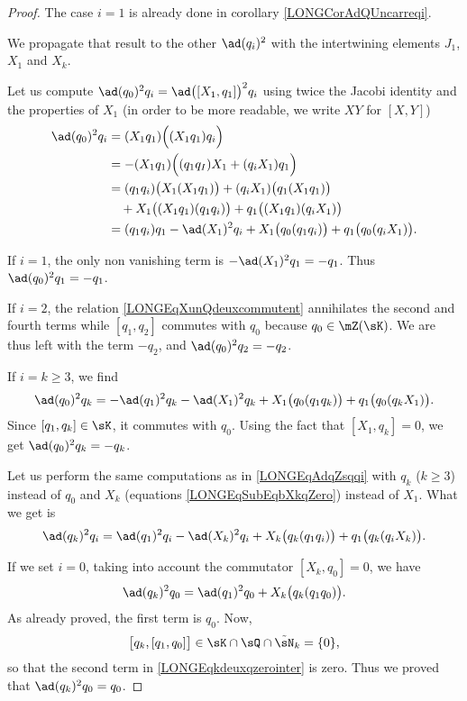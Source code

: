 \begin{proof}
	The case $i=1$ is already done in corollary \ref{LONGCorAdQUncarreqi}. 

	We propagate that result to the other $\ad(q_i)^2$ with the intertwining elements $J_1$, $X_1$ and $X_k$.

	Let us compute $\ad(q_0)^2q_i=\ad\big([X_1,q_1]\big)^2q_i$ using twice the Jacobi identity and the properties of $X_1$ (in order to be more readable, we write $XY$ for $[X,Y]$)
	\begin{equation}		\label{LONGEqAdqZsqqi}
		\begin{aligned}[]
			\ad(q_0)^2q_i	&=	(X_1q_1)\Big( (X_1q_1)q_i \Big)\\
					&=	-(X_1q_1)\Big( (q_1q_I)X_1+(q_iX_1)q_1 \Big)\\
					&=(q_1q_i)\big( X_1(X_1q_1) \big)+(q_iX_1)\big( q_1(X_1q_1) \big)\\
					&\quad + X_1\big( (X_1q_1)(q_1q_i) \big)+q_1\big( (X_1q_1)(q_iX_1) \big)\\
					&=(q_1q_i)q_1-\ad(X_1)^2q_i+X_1\big( q_0(q_1q_i) \big)+q_1\big( q_0(q_iX_1) \big).
		\end{aligned}
	\end{equation}
	
	If $i=1$, the only non vanishing term is $-\ad(X_1)^2q_1=-q_1$.  Thus $\ad(q_0)^2q_1=-q_1$.
	
	If $i=2$, the relation \eqref{LONGEqXunQdeuxcommutent} annihilates the second and fourth terms while $[q_1,q_2]$ commutes with $q_0$ because $q_0\in\mZ(\sK)$. We are thus left with the term $-q_2$, and $\ad(q_0)^2q_2=-q_2$.

	If $i=k\geq 3$, we find
	\begin{equation}
		\ad(q_0)^2q_k=-\ad(q_1)^2q_k-\ad(X_1)^2q_k+X_1\big( q_0(q_1q_k) \big)+q_1\big( q_0(q_kX_1) \big).
	\end{equation}
	Since $[q_1,q_k]\in\sK$, it commutes with $q_0$. Using the fact that $[X_1,q_k]=0$, we get $\ad(q_0)^2q_k=-q_k$.

	Let us perform the same computations  as in \eqref{LONGEqAdqZsqqi} with $q_k$ ($k\geq 3$) instead of $q_0$ and $X_k$ (equations \eqref{LONGEqSubEqbXkqZero}) instead of $X_1$. What we get is
	\begin{equation}
		\ad(q_k)^2q_i=\ad(q_1)^2q_i-\ad(X_k)^2q_i+X_k\big( q_k(q_1q_i) \big)+q_1\big( q_k(q_iX_k) \big).
	\end{equation}

	If we set $i=0$, taking into account the commutator $[X_k,q_0]=0$, we have
	\begin{equation}		\label{LONGEqkdeuxqzerointer}
		\ad(q_k)^2q_0=\ad(q_1)^2q_0+X_k\big( q_k(q_1q_0) \big).
	\end{equation}
	As already proved, the first term is $q_0$. Now,
	\begin{equation}
		\big[ q_k,[q_1,q_0] \big]\in\sK\cap\sQ\cap\tilde\sN_k=\{ 0 \},
	\end{equation}
	so that the second term in \eqref{LONGEqkdeuxqzerointer} is zero. Thus we proved that $\ad(q_k)^2q_0=q_0$.


\end{proof}
